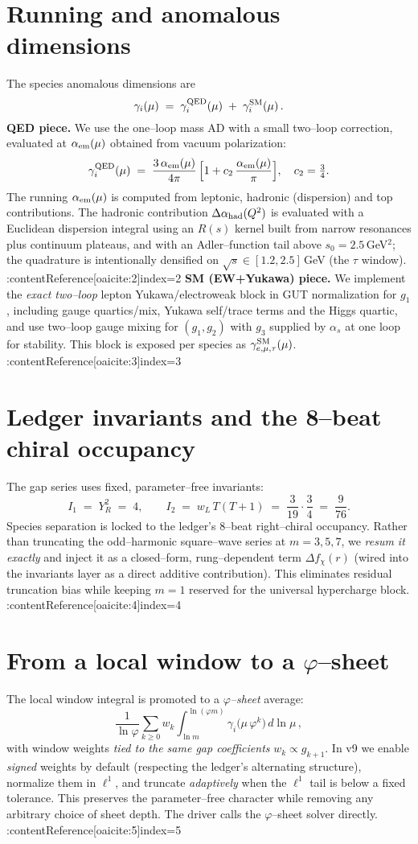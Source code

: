\documentclass[12pt]{article}
\begin{document}
\section*{Running and anomalous dimensions}
The species anomalous dimensions are
\[\gamma_i(\mu)\;=\;\gamma^{\rm QED}_i(\mu)\;+\;\gamma^{\rm SM}_i(\mu)\,.
\]
\textbf{QED piece.} We use the one--loop mass AD with a small two--loop correction, evaluated at $\alpha_{\rm em}(\mu)$ obtained from vacuum polarization:
\[\gamma^{\rm QED}_i(\mu)\;=\;\frac{3\,\alpha_{\rm em}(\mu)}{4\pi}\,\Bigl[1+c_2\,\frac{\alpha_{\rm em}(\mu)}{\pi}\Bigr],\quad c_2=\tfrac{3}{4}.
\]
The running $\alpha_{\rm em}(\mu)$ is computed from leptonic, hadronic (dispersion) and top contributions. The hadronic contribution $\Delta\alpha_{\rm had}(Q^2)$ is evaluated with a Euclidean dispersion integral using an $R(s)$ kernel built from narrow resonances plus continuum plateaus, and with an Adler--function tail above $s_0=2.5\,$GeV${}^2$; the quadrature is intentionally densified on $\sqrt{s}\!\in\![1.2,2.5]\,$GeV (the $\tau$ window). :contentReference[oaicite:2]{index=2}
\textbf{SM (EW+Yukawa) piece.} We implement the \emph{exact two--loop} lepton Yukawa/electroweak block in GUT normalization for $g_1$, including gauge quartics/mix, Yukawa self/trace terms and the Higgs quartic, and use two--loop gauge mixing for $(g_1,g_2)$ with $g_3$ supplied by $\alpha_s$ at one loop for stability. This block is exposed per species as $\gamma^{\rm SM}_{e,\mu,\tau}(\mu)$. :contentReference[oaicite:3]{index=3}
\section*{Ledger invariants and the 8--beat chiral occupancy}
The gap series uses fixed, parameter--free invariants:
\[I_1 \;=\; Y_R^2 \;=\; 4,\qquad I_2 \;=\; w_L\,T(T{+}1) \;=\; \frac{3}{19}\cdot\frac{3}{4}\;=\;\frac{9}{76}.\]
Species separation is locked to the ledger’s $8$--beat right--chiral occupancy. Rather than truncating the odd--harmonic square--wave series at $m=3,5,7$, we \emph{resum it exactly} and inject it as a closed--form, rung--dependent term $\Delta f_\chi(r)$ (wired into the invariants layer as a direct additive contribution). This eliminates residual truncation bias while keeping $m{=}1$ reserved for the universal hypercharge block. :contentReference[oaicite:4]{index=4}
\section*{From a local window to a $\varphi$--sheet}
The local window integral is promoted to a \emph{$\varphi$--sheet} average:
\[\frac{1}{\ln\varphi}\sum_{k\ge0} w_k \int_{\ln m}^{\ln(\varphi m)} \gamma_i\!\big(\mu\,\varphi^k\big)\,d\ln\mu\,,\]
with window weights \emph{tied to the same gap coefficients} $w_k\propto g_{k+1}$. In v9 we enable \emph{signed} weights by default (respecting the ledger’s alternating structure), normalize them in $\ell^1$, and truncate \emph{adaptively} when the $\ell^1$ tail is below a fixed tolerance. This preserves the parameter--free character while removing any arbitrary choice of sheet depth. The driver calls the $\varphi$--sheet solver directly. :contentReference[oaicite:5]{index=5}
\end{document}
